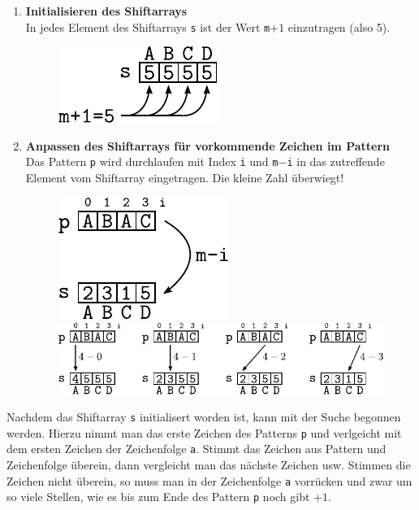 \begin{enumerate}
	\item \textbf{Initialisieren des Shiftarrays} \\
		In jedes Element des Shiftarrays \verb!s! ist der
		Wert \verb!m!$+1$ einzutragen (also 5).
		\begin{figure}[h!]
			\centering
			\includegraphics[scale=0.9]{quicksearch-1.pdf} 
		\end{figure}
	\item \textbf{Anpassen des Shiftarrays für vorkommende Zeichen 
		im Pattern} \\
		Das Pattern \verb!p! wird durchlaufen mit Index \verb!i!
		und \verb!m!$-$\verb!i! in das zutreffende Element vom
		Shiftarray eingetragen. Die kleine Zahl überwiegt!
		\begin{figure}[h!]
			\centering
			\hfill{} \hfill{}
			\includegraphics[scale=0.9]{quicksearch-2.pdf}
			\hfill{}
			\includegraphics[scale=0.9]{quicksearch-3.pdf}
		\end{figure}
\end{enumerate}

\noindent
Nachdem das Shiftarray \verb!s! initialisert worden ist, kann mit der
Suche begonnen werden. Hierzu nimmt man das erste Zeichen des Patterns
\verb!p! und verlgeicht mit dem ersten Zeichen der Zeichenfolge \verb!a!.
Stimmt das Zeichen aus Pattern und Zeichenfolge überein, dann vergleicht
man das nächste Zeichen usw. Stimmen die Zeichen nicht überein, so
muss man in der Zeichenfolge \verb!a! vorrücken und zwar um so viele 
Stellen, wie es bis zum Ende des Pattern \verb!p! noch gibt $+1$.

